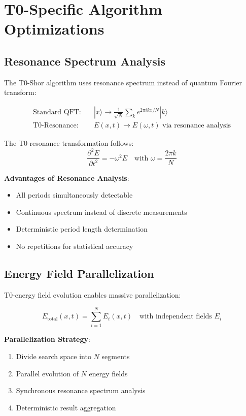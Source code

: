 \documentclass[12pt,a4paper]{article}
\newcommand{\Efield}{E}
\begin{document}
	\section{T0-Specific Algorithm Optimizations}
	
	\subsection{Resonance Spectrum Analysis}
	
	The T0-Shor algorithm uses resonance spectrum instead of quantum Fourier transform:
	
	\begin{align}
		\text{Standard QFT}: \quad &|x\rangle \rightarrow \frac{1}{\sqrt{N}}\sum_k e^{2\pi ikx/N}|k\rangle \\
		\text{T0-Resonance}: \quad &\Efield(x,t) \rightarrow \Efield(\omega,t) \text{ via resonance analysis}
	\end{align}
	
	The T0-resonance transformation follows:
	\begin{equation}
		\frac{\partial^2 \Efield}{\partial t^2} = -\omega^2 \Efield \quad \text{with } \omega = \frac{2\pi k}{N}
	\end{equation}
	
	\textbf{Advantages of Resonance Analysis}:
	\begin{itemize}
		\item All periods simultaneously detectable
		\item Continuous spectrum instead of discrete measurements  
		\item Deterministic period length determination
		\item No repetitions for statistical accuracy
	\end{itemize}
	
	\subsection{Energy Field Parallelization}
	
	T0-energy field evolution enables massive parallelization:
	
	\begin{equation}
		\Efield_{\text{total}}(x,t) = \sum_{i=1}^{N} \Efield_i(x,t) \quad \text{with independent fields } \Efield_i
	\end{equation}
	
	\textbf{Parallelization Strategy}:
	\begin{enumerate}
		\item Divide search space into $N$ segments
		\item Parallel evolution of $N$ energy fields
		\item Synchronous resonance spectrum analysis
		\item Deterministic result aggregation
	\end{enumerate}
	
\end{document}
